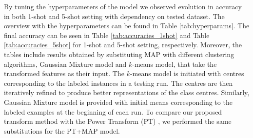 \documentclass[letterpaper]{article} \usepackage{aaai20}  \usepackage{times}  \usepackage{helvet} \usepackage{courier}  \usepackage[hyphens]{url}  \usepackage{graphicx} \urlstyle{rm} \def\UrlFont{\rm}  \usepackage{graphicx}  \frenchspacing  \setlength{\pdfpagewidth}{8.5in}  \setlength{\pdfpageheight}{11in}  \usepackage[ruled,vlined]{algorithm2e}
\begin{document}
\begin{table}[h!]
\caption{1-shot accuracy of models based on Power Transform (PT), our proposed Latent Space Transform (LST) and WideResNet backbone.}
\vspace{5mm}
\label{tab:accuracies_1shot}
\centering
{}
\end{table}

By tuning the hyperparameters of the model we observed evolution in accuracy in both 1-shot and 5-shot setting with dependency on tested dataset. The overview with the hyperparameters can be found in Table \ref{tab:hyperparams}. The final accuracy can be seen in Table \ref{tab:accuracies_1shot} and Table \ref{tab:accuracies_5shot} for 1-shot and 5-shot setting, respectively. Moreover, the tables include results obtained by substituting MAP with different clustering algorithms, Gaussian Mixture model and $k$-means model, that take the transformed features as their input. The $k$-means model is initiated with centres corresponding to the labeled instances in a testing run. The centres are then iteratively refined to produce better representations of the class centres. Similarly, Gaussian Mixture model is provided with initial means corresponding to the labeled examples at the beginning of each run. To compare our proposed transform method with the Power Transform (PT) \cite{hu2020leveraging}, we performed the same substitutions for the PT+MAP model. 
\end{document}
